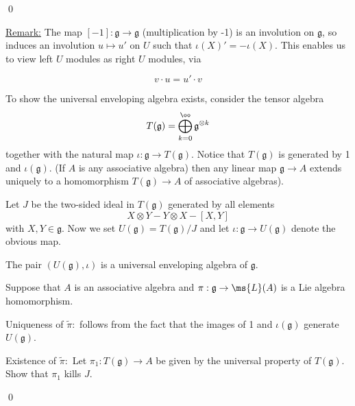\documentclass[x11names,reqno,14pt]{extarticle}
\newcommand{\mk}[1]{\mathfrak{#1}}
\newcommand{\g}{\mk{g}}
\begin{document}
\qed

\underline{Remark:} The map $[-1]:\g\to\g$ (multiplication by -1) is an involution on $\g$, so induces an involution $u \mapsto u'$ on $U$ such that $\iota(X)' = -\iota(X)$. This enables us to view left $U$ modules as right $U$ modules, via 

\[
v\cdot u = u'\cdot v
\]

To show the universal enveloping algebra exists, consider the tensor algebra 
\[
T(\g) = \bigoplus_{k=0}^\oo \g^{\otimes k}
\]
together with the natural map $\iota:\g\to T(\g)$. Notice that $T(\g)$ is generated by 1 and $\iota(\g)$. (If $A$ is any associative algebra) then any linear map $\g\to A$ extends uniquely to a homomorphism $T(\g)\to A$ of associative algebras). 

Let $J$ be the two-sided ideal in $T(\g)$ generated by all elements
\[
X\otimes Y - Y \otimes X - [X,Y]
\]
with $X, Y \in \g$. Now we set $U(\g) = T(\g)/J$ and let $\iota:\g\to U(\g)$ denote the obvious map. 

\thm

The pair $(U(\g), \iota)$ is a universal enveloping algebra of $\g$. 

\proof

Suppose that $A$ is an associative algebra and $\pi:\g\to\ms{L}(A)$ is a Lie algebra homomorphism. 

Uniqueness of $\tilde{\pi}:$ follows from the fact that the images of 1 and $\iota(\g)$ generate $U(\g)$. 

Existence of $\tilde{\pi}:$ Let $\pi_1:T(\g)\to A$ be given by the universal property of $T(\g)$. Show that $\pi_1$ kills $J$. 

\qed
\end{document}
